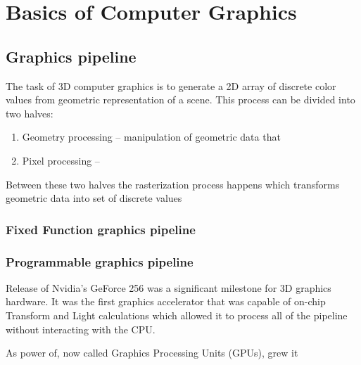 \chapter{Basics of Computer Graphics}

\section{Graphics pipeline}

The task of 3D computer graphics is to generate a 2D array of discrete color values from geometric representation of a scene. This process can be divided into two halves:
\begin{enumerate}
  \item Geometry processing -- manipulation of geometric data that
  \item Pixel processing -- 
\end{enumerate}

Between these two halves the rasterization process happens which transforms geometric data into set of discrete values 

\subsection{Fixed Function graphics pipeline}

\subsection{Programmable graphics pipeline}

Release of Nvidia's GeForce 256 was a significant milestone for 3D graphics hardware. It was the first graphics accelerator that was capable of on-chip Transform and Light calculations which allowed it to process all of the pipeline without interacting with the CPU.

As power of, now called Graphics Processing Units (GPUs), grew it 